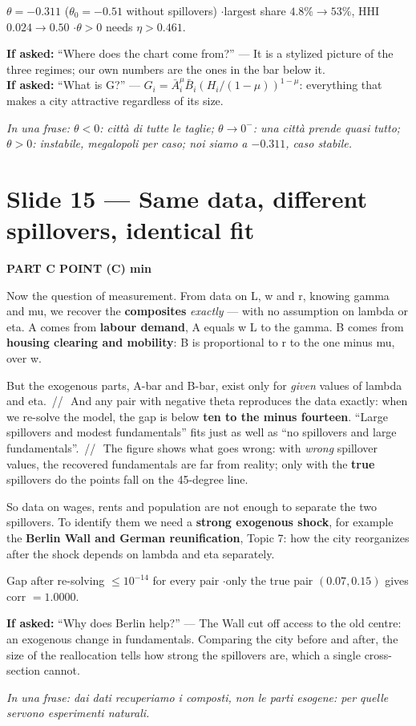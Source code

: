 \documentclass[11pt,a4paper]{article}
\newcommand{\slide}[3]{\Needspace{14\baselineskip}\section{#1}\textcolor{unicared}{\small\bfseries\MakeUppercase{#3}\quad\textperiodcentered\quad #2}\par}
\newcommand{\idea}[1]{\par{\small\itshape\color{unicablue}In una frase: #1}\par}
\newcommand{\pause}{\textcolor{unicared}{\,/\!/\,}}
\begin{document}
\begin{nums}
$\theta = -0.311$ ($\theta_0 = -0.51$ without spillovers) \quad$\cdot$\quad largest share $4.8\% \to 53\%$, HHI $0.024 \to 0.50$ \quad$\cdot$\quad $\theta>0$ needs $\eta > 0.461$.
\end{nums}
\begin{ask}
\textbf{If asked:} ``Where does the chart come from?'' --- It is a stylized picture of the three regimes; our own numbers are the ones in the bar below it. \\
\textbf{If asked:} ``What is G?'' --- $G_i = \bar A_i^{\mu}\bar B_i (H_i/(1-\mu))^{1-\mu}$: everything that makes a city attractive regardless of its size.
\end{ask}
\idea{$\theta<0$: città di tutte le taglie; $\theta\to0^-$: una città prende quasi tutto; $\theta>0$: instabile, megalopoli per caso; noi siamo a $-0.311$, caso stabile.}
\slide{Slide 15 --- Same data, different spillovers, identical fit}{1 min}{Part C \textperiodcentered{} point (c)}

\begin{say}
Now the question of measurement. From data on L, w and r, knowing gamma and mu, we recover the \textbf{composites} \emph{exactly} --- with no assumption on lambda or eta. A comes from \textbf{labour demand}, A equals w L to the gamma. B comes from \textbf{housing clearing and mobility}: B is proportional to r to the one minus mu, over w.

But the exogenous parts, A-bar and B-bar, exist only for \emph{given} values of lambda and eta. \pause\ And any pair with negative theta reproduces the data exactly: when we re-solve the model, the gap is below \textbf{ten to the minus fourteen}. ``Large spillovers and modest fundamentals'' fits just as well as ``no spillovers and large fundamentals''. \pause\ The figure shows what goes wrong: with \emph{wrong} spillover values, the recovered fundamentals are far from reality; only with the \textbf{true} spillovers do the points fall on the 45-degree line.

So data on wages, rents and population are not enough to separate the two spillovers. To identify them we need a \textbf{strong exogenous shock}, for example the \textbf{Berlin Wall and German reunification}, Topic 7: how the city reorganizes after the shock depends on lambda and eta separately.
\end{say}

\begin{nums}
Gap after re-solving $\leq 10^{-14}$ for every pair \quad$\cdot$\quad only the true pair $(0.07, 0.15)$ gives corr $= 1.0000$.
\end{nums}
\begin{ask}
\textbf{If asked:} ``Why does Berlin help?'' --- The Wall cut off access to the old centre: an exogenous change in fundamentals. Comparing the city before and after, the size of the reallocation tells how strong the spillovers are, which a single cross-section cannot.
\end{ask}
\idea{dai dati recuperiamo i composti, non le parti esogene: per quelle servono esperimenti naturali.}
\end{document}
